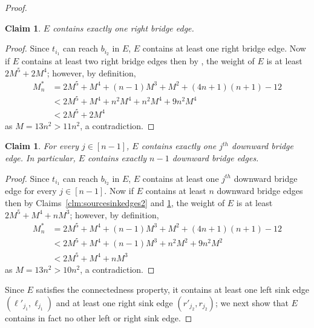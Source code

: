 \documentclass[a4paper,11pt]{article}
\theoremstyle{plain}
\newtheorem{claim}[theorem]{Claim}
\newtheorem{identification rule}{Identification Rule}
\theoremstyle{definition}
\theoremstyle{remark}
\newenvironment{claimproof}{\begin{proof}\renewcommand{\qedsymbol}{\claimqed}}{\end{proof}\renewcommand{\qedsymbol}{\plainqed}}
\let\plainqed\qedsymbol
\newcommand{\claimqed}{$\lrcorner$}
\begin{document}
\begin{proof}
\begin{claim}
\label{clm:rightbridge}
$E$ contains exactly one right bridge edge.
\end{claim}

\begin{claimproof}
Since $t_{i_1}$ can reach $b_{i_2}$ in $E$, $E$ contains at least one right bridge edge. Now if $E$ contains at least two right bridge edges then by , the weight of $E$ is at least $2M^5 + 2M^4$; however, by definition,
\begin{equation*}
\begin{split}
M_n^* &= 2M^5 + M^4 + (n-1)M^3 + M^2 + (4n+1)(n+1) - 12\\
& < 2M^5 + M^4 + n^2M^4 + n^2M^4 + 9n^2M^4 \\
& < 2M^5 + 2M^4
\end{split}
\end{equation*}
as $M = 13n^2 > 11n^2$, a contradiction.
\end{claimproof}

\begin{claim}
\label{clm:downwardbridges}
For every $j \in [n-1]$, $E$ contains exactly one $j^{th}$ downward bridge edge. In particular, $E$ contains exactly $n-1$ downward bridge edges.
\end{claim}

\begin{claimproof}
Since $t_{i_1}$ can reach $b_{i_2}$ in $E$, $E$ contains at least one $j^{th}$ downward bridge edge for every $j \in [n-1]$. Now if $E$ contains at least $n$ downward bridge edges then by Claims~\ref{clm:sourcesinkedges2} and \ref{clm:rightbridge}, the weight of $E$ is at least $2M^5 + M^4 + nM^3$; however, by definition,
\begin{equation*}
\begin{split}
M_n^* &=  2M^5 + M^4 + (n-1)M^3 + M^2 + (4n+1)(n+1) - 12\\
& < 2M^5 + M^4 + (n-1)M^3 + n^2M^2 + 9n^2M^2 \\
& < 2M^5 + M^4 + nM^3
\end{split}
\end{equation*}
as $M = 13n^2 > 10n^2$, a contradiction.
\end{claimproof}

Since $E$ satisfies the connectedness property, it contains at least one left sink edge $(\ell'_{j_1},\ell_{j_1})$ and at least one right sink edge $(r'_{j_2},r_{j_2})$; we next show that $E$ contains in fact no other left or right sink edge.


\end{proof}
\end{document}
